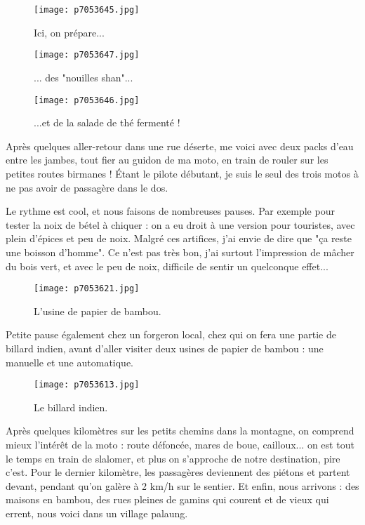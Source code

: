 \documentclass{book}
\begin{document}
\begin{figure}[h]
\centering
\texttt{[image: p7053645.jpg]}
\caption*{Ici, on prépare...}
\end{figure}


\begin{figure}[h]
\centering
\texttt{[image: p7053647.jpg]}
\caption*{... des "nouilles shan"...}
\end{figure}


\begin{figure}[h]
\centering
\texttt{[image: p7053646.jpg]}
\caption*{...et de la salade de thé fermenté !}
\end{figure}

Après quelques aller-retour dans une rue déserte, me voici avec deux packs d'eau entre les jambes, tout fier au guidon de ma moto, en train de rouler sur les petites routes birmanes ! Étant le pilote débutant, je suis le seul des trois motos à ne pas avoir de passagère dans le dos.



Le rythme est cool, et nous faisons de nombreuses pauses. Par exemple pour tester la noix de bétel à chiquer : on a eu droit à une version pour touristes, avec plein d'épices et peu de noix. Malgré ces artifices, j'ai envie de dire que "ça reste une boisson d'homme". Ce n'est pas très bon, j'ai surtout l'impression de mâcher du bois vert, et avec le peu de noix, difficile de sentir un quelconque effet...


\begin{figure}[h]
\centering
\texttt{[image: p7053621.jpg]}
\caption*{L'usine de papier de bambou.}
\end{figure}

Petite pause également chez un forgeron local, chez qui on fera une partie de billard indien, avant d'aller visiter deux usines de papier de bambou : une manuelle et une automatique.


\begin{figure}[h]
\centering
\texttt{[image: p7053613.jpg]}
\caption*{Le billard indien.}
\end{figure}

Après quelques kilomètres sur les petits chemins dans la montagne, on comprend mieux l'intérêt de la moto : route défoncée, mares de boue, cailloux... on est tout le temps en train de slalomer, et plus on s'approche de notre destination, pire c'est. Pour le dernier kilomètre, les passagères deviennent des piétons et partent devant, pendant qu'on galère à 2 km/h sur le sentier. Et enfin, nous arrivons : des maisons en bambou, des rues pleines de gamins qui courent et de vieux qui errent, nous voici dans un village palaung.
\end{document}
